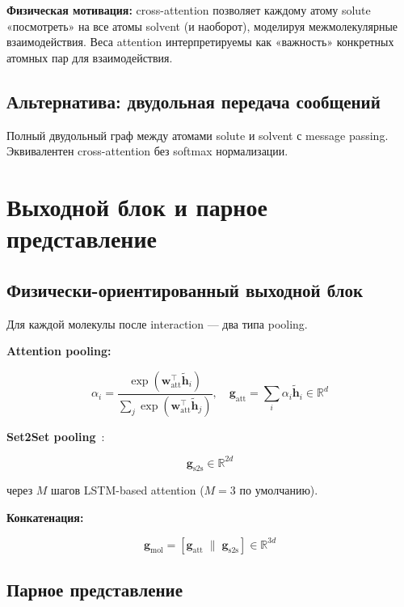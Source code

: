 \documentclass[11pt]{article}
\begin{document}
\textbf{Физическая мотивация:} cross-attention позволяет каждому атому solute «посмотреть» на все атомы solvent (и наоборот), моделируя межмолекулярные взаимодействия. Веса attention интерпретируемы как «важность» конкретных атомных пар для взаимодействия.

\subsection{Альтернатива: двудольная передача сообщений}

Полный двудольный граф между атомами solute и solvent с message passing. Эквивалентен cross-attention без softmax нормализации.

\section{Выходной блок и парное представление}
\label{sec:readout-pair}

\subsection{Физически-ориентированный выходной блок}

Для каждой молекулы после interaction --- два типа pooling.

\textbf{Attention pooling:}

\begin{equation*}
\alpha_i = \frac{\exp(\mathbf{w}_{\mathrm{att}}^\top \tilde{\mathbf{h}}_i)}{\sum_j \exp(\mathbf{w}_{\mathrm{att}}^\top \tilde{\mathbf{h}}_j)}, \quad \mathbf{g}_{\mathrm{att}} = \sum_i \alpha_i \tilde{\mathbf{h}}_i \in \mathbb{R}^{d}
\end{equation*}

\textbf{Set2Set pooling}~\cite{vinyals2016}:

\begin{equation*}
\mathbf{g}_{\mathrm{s2s}} \in \mathbb{R}^{2d}
\end{equation*}

через $M$ шагов LSTM-based attention ($M = 3$ по умолчанию).

\textbf{Конкатенация:}

\begin{equation*}
\mathbf{g}_{\mathrm{mol}} = [\mathbf{g}_{\mathrm{att}} \;\|\; \mathbf{g}_{\mathrm{s2s}}] \in \mathbb{R}^{3d}
\end{equation*}

\subsection{Парное представление}
\end{document}
